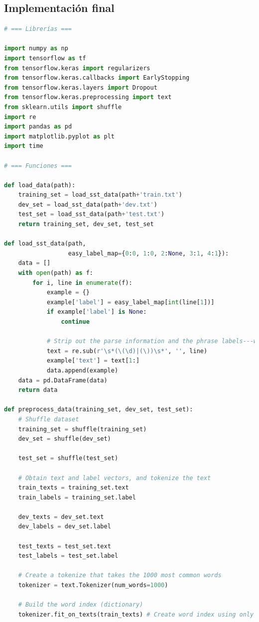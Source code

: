 \documentclass{report}
\begin{document}
      \subsection*{Implementación final}
        \begin{lstlisting}[language=Python, caption=Implementación final del perceptron]
# === Librerías ===

import numpy as np
import tensorflow as tf
from tensorflow.keras import regularizers
from tensorflow.keras.callbacks import EarlyStopping
from tensorflow.keras.layers import Dropout
from tensorflow.keras.preprocessing import text
from sklearn.utils import shuffle
import re
import pandas as pd
import matplotlib.pyplot as plt
import time

# === Funciones ===

def load_data(path):
    training_set = load_sst_data(path+'train.txt')
    dev_set = load_sst_data(path+'dev.txt')
    test_set = load_sst_data(path+'test.txt')
    return training_set, dev_set, test_set

def load_sst_data(path,
                  easy_label_map={0:0, 1:0, 2:None, 3:1, 4:1}):
    data = []
    with open(path) as f:
        for i, line in enumerate(f):
            example = {}
            example['label'] = easy_label_map[int(line[1])]
            if example['label'] is None:
                continue

            # Strip out the parse information and the phrase labels---we don't need those here
            text = re.sub(r'\s*(\(\d)|(\))\s*', '', line)
            example['text'] = text[1:]
            data.append(example)
    data = pd.DataFrame(data)
    return data

def preprocess_data(training_set, dev_set, test_set):
    # Shuffle dataset
    training_set = shuffle(training_set)
    dev_set = shuffle(dev_set)

    test_set = shuffle(test_set)

    # Obtain text and label vectors, and tokenize the text
    train_texts = training_set.text
    train_labels = training_set.label

    dev_texts = dev_set.text
    dev_labels = dev_set.label

    test_texts = test_set.text
    test_labels = test_set.label

    # Create a tokenize that takes the 1000 most common words
    tokenizer = text.Tokenizer(num_words=1000)

    # Build the word index (dictionary)
    tokenizer.fit_on_texts(train_texts) # Create word index using only training part


\end{lstlisting}
\end{document}
